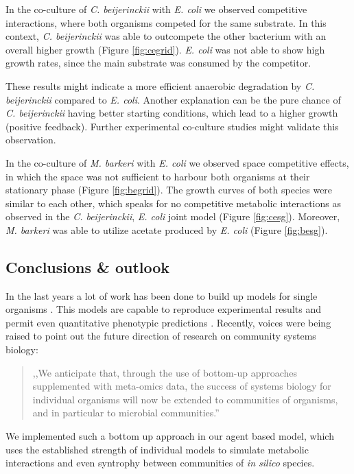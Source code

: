 In the co-culture of \textit{C. beijerinckii} with \textit{E. coli} we observed competitive interactions, where both organisms competed for the same substrate. In this context, \textit{C. beijerinckii} was able to outcompete the other bacterium with an overall higher growth (Figure \hyperref[fig:cegrid]{\ref{fig:cegrid}}). \textit{E. coli} was not able to show high growth rates, since the main substrate was consumed by the competitor.

These results might indicate a more efficient anaerobic degradation by \textit{C. beijerinckii} compared to \textit{E. coli}.
Another explanation can be the pure chance of \textit{C. beijerinckii} having better starting conditions, which lead to a higher growth (positive feedback).
Further experimental co-culture studies might validate this observation.

In the co-culture of \textit{M. barkeri} with \textit{E. coli} we observed space competitive effects, in which the space was not sufficient to harbour both organisms at their stationary phase (Figure \hyperref[fig:begrid]{\ref{fig:begrid}}). The growth curves of both species were similar to each other, which speaks for no competitive metabolic interactions as observed in the \textit{C. beijerinckii}, \textit{E. coli} joint model (Figure \hyperref[fig:cesg]{\ref{fig:cesg}}).
Moreover, \textit{M. barkeri} was able to utilize acetate produced by \textit{E. coli} (Figure \hyperref[fig:besg]{\ref{fig:besg}}).

\subsection{Conclusions \& outlook}
In the last years a lot of work has been done to build up models for single organisms \cite{lewis2012}.
This models are capable to reproduce experimental results and permit even quantitative phenotypic predictions \cite{mccloskey}.
Recently, voices were being raised to point out the future direction of research on community systems biology:
\begin{quote}
,,We anticipate that, through the use of bottom-up approaches supplemented with meta-omics data, the success of systems biology for individual organisms will now be extended to communities of organisms, and in particular to microbial communities.'' \cite{cosys}
\end{quote}
We implemented such a bottom up approach in our agent based model, which uses the established strength of individual models to simulate metabolic interactions and even syntrophy between communities of \textit{in silico} species.
